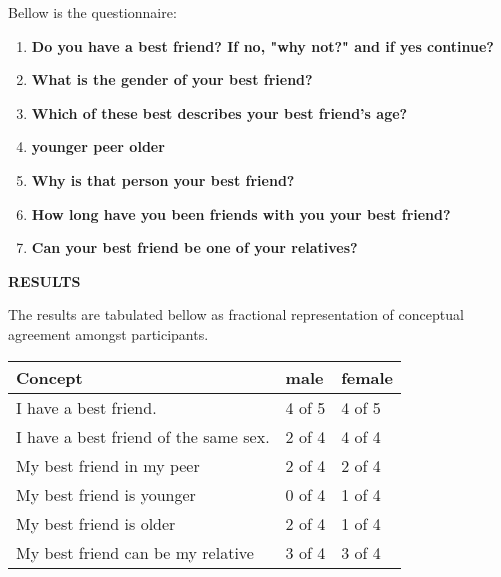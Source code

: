 \documentclass[11pt,a4paper,final]{report}
\begin{document}
\noindent 

\noindent Bellow is the questionnaire:

\noindent 

\begin{enumerate}
\item  \textbf{Do you have a best friend? If no, "why not?" and if yes continue?}

\item \textbf{ What is the gender of your best friend?}

\item \textbf{ Which of these best describes your best friend's age?}

\item \textbf{ younger peer older}

\item \textbf{ Why is that person your best friend?}

\item \textbf{ How long have you been friends with you your best friend?}

\item \textbf{ Can your best friend be one of your relatives?}
\end{enumerate}

\noindent \textbf{}

\noindent \textbf{RESULTS}

\noindent The results are tabulated bellow as fractional representation of conceptual agreement amongst participants.\\

\noindent 

\begin{tabular}{|p{1.9in}|p{1.1in}|p{1.0in}|} \hline 
\textbf{Concept} & \textbf{male} & \textbf{female} \\ \hline 
I have a best friend. & 4 of 5 & 4 of 5 \\ \hline 
I have a best friend of the same sex. & 2 of 4 & 4 of 4 \\ \hline 
My best friend in my peer & 2 of 4 & 2 of 4 \\ \hline 
My best friend is younger & 0 of 4 & 1 of 4 \\ \hline 
My best friend is older & 2 of 4 & 1 of 4 \\ \hline 
My best friend can be my relative & 3 of 4 & 3 of 4 \\ \hline 
\end{tabular}\\
\end{document}

